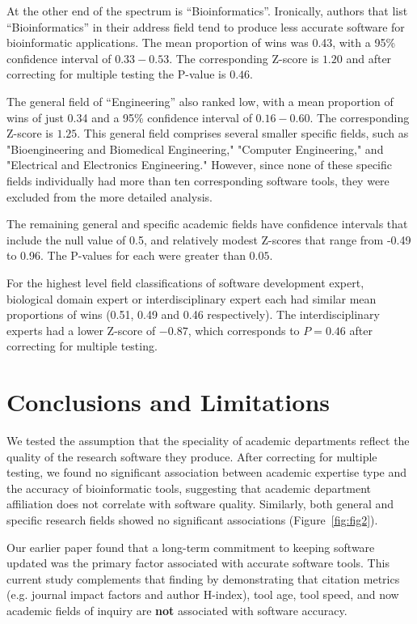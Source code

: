 \documentclass[fleqn,10pt,doc,onecolumn]{SelfArx}%
\begin{document}
At the other end of the spectrum is ``Bioinformatics''. Ironically,
authors that list ``Bioinformatics'' in their address field tend to
produce less accurate software for bioinformatic applications. The
mean proportion of wins was 0.43, with a 95\% confidence interval of
$0.33-0.53$. The corresponding Z-score is $1.20$ and after correcting
for multiple testing the P-value is $0.46$.


The general field of ``Engineering'' also ranked low, with a mean
proportion of wins of just 0.34 and a 95\% confidence interval of
$0.16-0.60$. The corresponding Z-score is $1.25$. This general field
comprises several smaller specific fields, such as "Bioengineering and
Biomedical Engineering," "Computer Engineering," and "Electrical and
Electronics Engineering." However, since none of these specific fields
individually had more than ten corresponding software tools, they were
excluded from the more detailed analysis.

The remaining general and specific academic fields have confidence
intervals that include the null value of 0.5, and relatively modest
Z-scores that range from -0.49 to 0.96. The P-values for each were
greater than $0.05$. 

For the highest level field classifications of software development
expert, biological domain expert or interdisciplinary expert each had
similar mean proportions of wins (0.51, 0.49 and 0.46
respectively). The interdisciplinary experts had a lower Z-score of
$-0.87$, which corresponds to $P=0.46$ after correcting for multiple
testing.


\section*{Conclusions and Limitations}

We tested the assumption that the speciality of academic departments
reflect the quality of the research software they produce.  After
correcting for multiple testing, we found no significant association
between academic expertise type and the accuracy of bioinformatic
tools, suggesting that academic department affiliation does not
correlate with software quality. Similarly, both general and specific
research fields showed no significant associations
(Figure~\ref{fig:fig2}).

Our earlier paper found that a long-term commitment to keeping
software updated was the primary factor associated with accurate
software tools. This current study complements that finding by demonstrating 
that citation metrics (e.g. journal impact factors and
author H-index), tool age, tool speed, and now academic fields of
inquiry are \textbf{not} associated with software accuracy.
\end{document}
